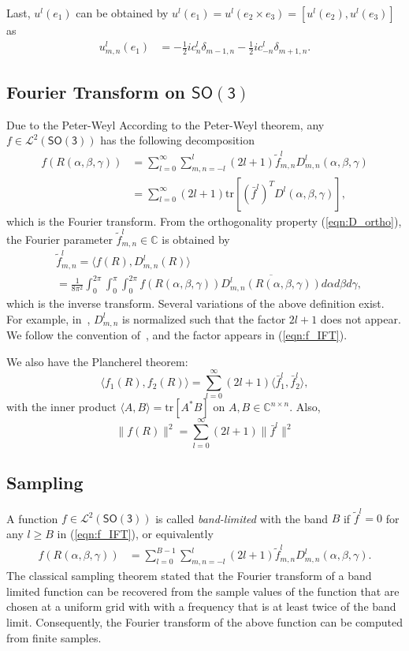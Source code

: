 \documentclass[onecolumn,11pt]{ieeetran}
\newcommand{\pair}[1]{\ensuremath{\langle #1 \rangle}}
\newcommand{\refeqn}[1]{(\ref{eqn:#1})}
\newcommand{\trs}[1]{\mathrm{tr}\ensuremath{[#1]}}
\newcommand{\SO}{\ensuremath{\mathsf{SO(3)}}}
\newcommand{\Cp}{\ensuremath{\mathbb{C}}}
\begin{document}
Last, $u^l(e_1)$ can be obtained by $u^l(e_1)=u^l(e_2\times e_3)=[u^l(e_2), u^l(e_3)]$ as
\begin{align}
u^l_{m,n}(e_1) 
& = -\frac{1}{2}i c^l_n \delta_{m-1,n}-\frac{1}{2}i c^l_{-n} \delta_{m+1,n}.
\end{align}

\subsection{Fourier Transform on $\SO$}

Due to the Peter-Weyl
According to the Peter-Weyl theorem, any $f\in\mathcal{L}^2(\SO)$ has the following decomposition
\begin{align}
f(R(\alpha,\beta,\gamma)) &= \sum_{l=0}^\infty \sum_{m,n=-l}^l (2l+1)\tilde f^l_{m,n} D^l_{m,n}(\alpha,\beta,\gamma)\nonumber\\
&= \sum_{l=0}^\infty (2l+1)\trs{(\bar f^l)^T D^l(\alpha,\beta,\gamma)},\label{eqn:f_IFT}
\end{align}
which is the Fourier transform. From the orthogonality property \refeqn{D_ortho}, the Fourier parameter $\tilde f^l_{m,n}\in\Cp$ is obtained by
\begin{align}
& \tilde f^l_{m,n}=\pair{ f(R), D^l_{m,n}(R)}\nonumber\\
& =\frac{1}{8\pi^2}\int_0^{2\pi}\int_{0}^\pi\int_0^{2\pi} f(R(\alpha,\beta,\gamma)) \overline{D^{l}_{m,n}(R(\alpha,\beta,\gamma))}d\alpha d\beta d\gamma,\label{eqn:f_FT}
\end{align}
which is the inverse transform. Several variations of the above definition exist. For example, in~\cite{KosRocJFAA08}, $D^l_{m,n}$ is normalized such that the factor $2l+1$ does not appear. We follow the convention of~\cite{ChiKya01}, and the factor appears in \refeqn{f_IFT}.

We also have the Plancherel theorem:
\[
\pair{f_1(R), f_2(R)} = \sum_{l=0}^\infty (2l+1)\pair{\bar f_1^l, \bar f_2^l},
\]
with the inner product $\pair{A,B}=\trs{A^*B}$ on $A,B\in\Cp^{n\times n}$. Also, 
\[
\| f(R)\|^2 = \sum_{l=0}^\infty (2l+1)\|\bar f^l\|^2
\]


\subsection{Sampling}

A function $f\in\mathcal{L}^2(\SO)$ is called \textit{band-limited} with the band $B$ if $\tilde f^l=0$ for any $l\geq B$ in \refeqn{f_IFT}, or equivalently
\begin{align}
f(R(\alpha,\beta,\gamma)) &= \sum_{l=0}^{B-1} \sum_{m,n=-l}^l (2l+1)\tilde f^l_{m,n} D^l_{m,n}(\alpha,\beta,\gamma).\label{eqn:fB}
\end{align}
The classical sampling theorem stated that the Fourier transform of a band limited function can be recovered from the sample values of the function that are chosen at a uniform grid with with a frequency that is at least twice of the band limit. Consequently, the Fourier transform of the above function can be computed from finite samples. 
\end{document}
